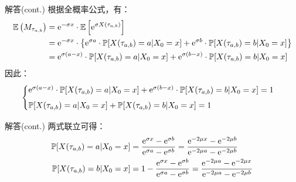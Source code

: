 \documentclass[t]{beamer}
\renewcommand{\Pr}{\mathbb{P}}
\newcommand{\E}{\mathbb{E}}
\begin{document}
      \begin{frame}{解答(cont.)}
        根据全概率公式，有：
        \[\begin{split}
        \E\left(M_{\tau_{a,b}}\right) &= {\rm e}^{-\sigma x} \cdot  \E\left[{\rm e}^{\sigma X(\tau_{a,b})}\right]\\
        &= {\rm e}^{-\sigma x}  \cdot \left\{ {\rm e}^{\sigma a}\cdot\Pr[X(\tau_{a,b})=a|X_0=x] + {\rm e}^{\sigma b}\cdot\Pr[X(\tau_{a,b})=b|X_0=x] \right\}\\
        &={\rm e}^{\sigma (a-x)} \cdot \Pr[X(\tau_{a,b})=a|X_0=x] +{\rm e}^{\sigma (b-x)} \cdot \Pr[X(\tau_{a,b})=b|X_0=x]
        \end{split} \]
        因此：
        \[\begin{cases}
        \vspace{1ex} {\rm e}^{\sigma (a-x)} \cdot \Pr[X(\tau_{a,b})=a|X_0=x] +{\rm e}^{\sigma (b-x)} \cdot \Pr[X(\tau_{a,b})=b|X_0=x]=1\\
        \Pr[X(\tau_{a,b})=a|X_0=x] +\Pr[X(\tau_{a,b})=b|X_0=x]=1 
        \end{cases} \]
      \end{frame}

      \begin{frame}{解答(cont.)}
        两式联立可得：
        \begin{equation*}
        \begin{split}
        \Pr[X(\tau_{a,b})=a|X_0=x] &=\frac{{\rm e}^{\sigma x}-{\rm e}^{\sigma b}}{{\rm e}^{\sigma a}-{\rm e}^{\sigma b}}=\frac{{\rm e}^{-2\mu x}-{\rm e}^{-2\mu b}}{{\rm e}^{-2\mu a}-{\rm e}^{-2\mu b}}\\
        \Pr[X(\tau_{a,b})=b|X_0=x] &=1-\frac{{\rm e}^{\sigma x}-{\rm e}^{\sigma b}}{{\rm e}^{\sigma a}-{\rm e}^{\sigma b}}=\frac{{\rm e}^{-2\mu a}-{\rm e}^{-2\mu x}}{{\rm e}^{-2\mu a}-{\rm e}^{-2\mu b}}
        \end{split}
        \end{equation*}    
      \end{frame}

  
\end{document}
